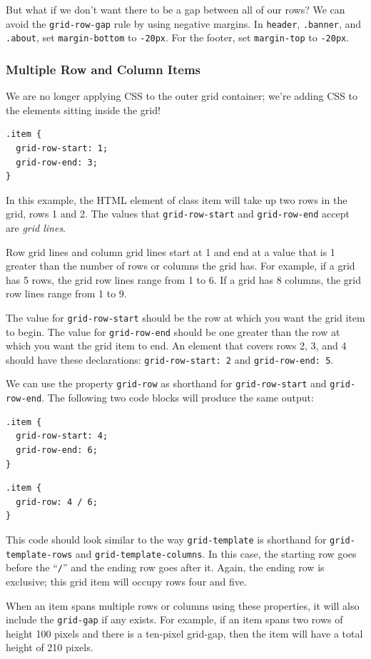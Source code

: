 \documentclass[a4paper, 12pt]{article}
\begin{document}
But what if we don't want there to be a gap between all of our rows? We can avoid the \verb|grid-row-gap| rule by using negative margins. In \verb|header|, \verb|.banner|, and \verb|.about|, set \verb|margin-bottom| to \verb|-20px|. For the footer, set \verb|margin-top| to \verb|-20px|.

\subsubsection{Multiple Row and Column Items}
We are no longer applying CSS to the outer grid container; we're adding CSS to the elements sitting inside the grid!
\begin{verbatim}
.item {
  grid-row-start: 1;
  grid-row-end: 3;
}
\end{verbatim}
In this example, the HTML element of class item will take up two rows in the grid, rows 1 and 2. The values that \verb|grid-row-start| and \verb|grid-row-end| accept are \textit{grid lines}.

Row grid lines and column grid lines start at 1 and end at a value that is 1 greater than the number of rows or columns the grid has. For example, if a grid has 5 rows, the grid row lines range from 1 to 6. If a grid has 8 columns, the grid row lines range from 1 to 9.

The value for \verb|grid-row-start| should be the row at which you want the grid item to begin. The value for \verb|grid-row-end| should be one greater than the row at which you want the grid item to end. An element that covers rows 2, 3, and 4 should have these declarations: \verb|grid-row-start: 2| and \verb|grid-row-end: 5|.

We can use the property \verb|grid-row| as shorthand for \verb|grid-row-start| and \verb|grid-row-end|. The following two code blocks will produce the same output:
\begin{verbatim}
.item {
  grid-row-start: 4;
  grid-row-end: 6;
}
\end{verbatim}

\begin{verbatim}
.item {
  grid-row: 4 / 6;
}
\end{verbatim}
This code should look similar to the way \verb|grid-template| is shorthand for \verb|grid-template-rows| and \verb|grid-template-columns|. In this case, the starting row goes before the ``\verb|/|'' and the ending row goes after it. Again, the ending row is exclusive; this grid item will occupy rows four and five.

When an item spans multiple rows or columns using these properties, it will also include the \verb|grid-gap| if any exists. For example, if an item spans two rows of height 100 pixels and there is a ten-pixel grid-gap, then the item will have a total height of 210 pixels.
\end{document}
